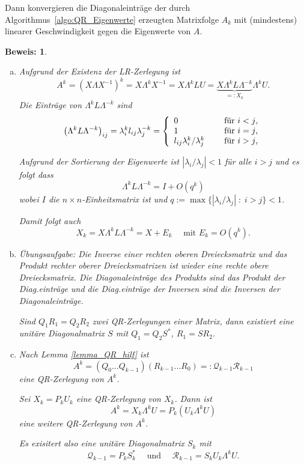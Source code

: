 \documentclass[12pt,a4paper]{book}
\theoremstyle{break}
\theoremstyle{nonumberplain}
\newtheorem{beweis}{Beweis:}
\newcommand{\1}{\mathbbm{1}} 			      	%
\newcommand{\dd}{\; : \;}    			      	%
\newcommand{\labeq}[1]{\label{eq:#1}}			%
\begin{document}
Dann konvergieren die Diagonaleinträge der durch Algorithmus~\ref{algo:QR_Eigenwerte} erzeugten 
Matrixfolge $A_k$ mit (mindestens) linearer Geschwindigkeit gegen die Eigenwerte von $A$.
\begin{beweis}

\begin{enumerate}[(a)]
%
\item Aufgrund der Existenz der LR-Zerlegung ist
\[
A^k=(X\Lambda X^{-1})^k = X \Lambda^k X^{-1}=X\Lambda^k LU = \underbrace{ X  \Lambda^k L \Lambda^{-k}}_{=:X_k} \Lambda^k  U.
\]
Die Einträge von $\Lambda^k L \Lambda^{-k}$ sind 
\[
\left( \Lambda^k L \Lambda^{-k}\right)_{ij}=\lambda_i^k l_{ij} \lambda_j^{-k}
=\left\{ \begin{array}{l l} 0 & \quad \mbox{ für $i<j$,}\\1 & \quad \mbox{ für $i=j$,}\\
l_{ij} \lambda_i^k / \lambda_j^k & \quad \mbox{ für $i>j$,}\end{array}\right.
\]

Aufgrund der Sortierung der Eigenwerte ist $|\lambda_i/\lambda_j|<1$ für alle $i>j$ und es folgt
dass 
\[
\Lambda^k L \Lambda^{-k}=I + O(q^k)
\]
wobei $I$ die $n\times n$-Einheitsmatrix ist und $q:=\max\{ |\lambda_i/\lambda_j| \dd i>j\}<1$. 

Damit folgt auch 
\begin{equation}\labeq{QRKonv_hilf1}
X_k=X\Lambda^k L \Lambda^{-k}=X+E_k \quad \mbox{ mit } E_k=O(q^k).
\end{equation}


\item Übungsaufgabe: Die Inverse einer rechten oberen Dreiecksmatrix und das Produkt rechter oberer Dreiecksmatrizen ist wieder eine rechte obere Dreiecksmatrix. Die Diagonaleinträge des Produkts sind das Produkt der Diag.einträge und die Diag.einträge der Inversen sind die Inversen der Diagonaleinträge. 

Sind $Q_1 R_1=Q_2 R_2$ zwei QR-Zerlegungen einer Matrix, dann existiert eine unitäre Diagonalmatrix $S$ mit
$Q_1=Q_2S^*$, $R_1=SR_2$.
%
\item Nach Lemma \ref{lemma_QR_hilf} ist
\[
A^k= (Q_0 \dots Q_{k-1})(R_{k-1} \dots R_0)=:\mathcal Q_{k-1} \mathcal R_{k-1}
\]
eine QR-Zerlegung von $A^k$.

Sei $X_k=P_k U_k$ eine QR-Zerlegung von $X_k$. Dann ist
\[
A^k=X_k \Lambda^k U= P_k (U_k \Lambda^k U)
\]
eine weitere QR-Zerlegung von $A^k$.

Es exisitert also eine unitäre Diagonalmatrix $S_k$ mit
\[
\mathcal Q_{k-1}=P_k S_k^* \quad \mbox{ und } \quad \mathcal R_{k-1}=S_k U_k \Lambda^k U.
\]


\end{enumerate}
\end{beweis}
\end{document}
